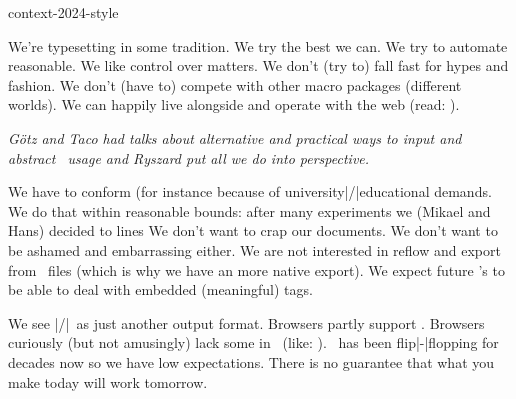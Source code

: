 
\environment context-2024-style

\useMPlibrary[segments]


\startdocument
  [title={drawing lines},
   banner={tagging and exporting},
   location={context\enspace {\bf 2024}\enspace meeting}]

\starttitle[title=The context]

\startitemize
\startitem We're typesetting in some tradition. \stopitem
\startitem We try the best we can. \stopitem
\startitem We try to automate reasonable. \stopitem
\startitem We like control over matters. \stopitem
\startitem We don't (try to) fall fast for hypes and fashion. \stopitem
\startitem We don't (have to) compete with other macro packages (different worlds). \stopitem
\startitem We can happily live alongside and operate with the web (read: \HTML). \stopitem
\stopitemize

\vfill

{\em Götz and Taco had talks about alternative and practical ways to input and
abstract \TEX\ usage and Ryszard put all we do into perspective.    }

\stoptitle

\starttitle[title=Tagging]

\startitemize
\startitem We have to conform (for instance because of university|/|educational demands. \stopitem
\startitem We do that within reasonable bounds: after many experiments we (Mikael and Hans) decided to lines \stopitem
\startitem We don't want to crap our documents. We don't want to be ashamed and embarrassing either. \stopitem
\startitem We are not interested in reflow and export from \PDF\ files (which is why we have an more native export). \stopitem
\startitem We expect future \LLM's to be able to deal with embedded (meaningful) tags. \stopitem
\stopitemize

\stoptitle

\starttitle[title=Exporting]

\startitemize
\startitem We see \XML|/|\HTML\ as just another output format. \stopitem
\startitem Browsers partly support \XML. \stopitem
\startitem Browsers curiously (but not amusingly) lack some in \HTML\ (like: \XLINK). \stopitem
\startitem \MATHML\ has been flip|-|flopping for decades now so we have low expectations. \stopitem
\startitem There is no guarantee that what you make today will work tomorrow. \stopitem
\stopitemize

